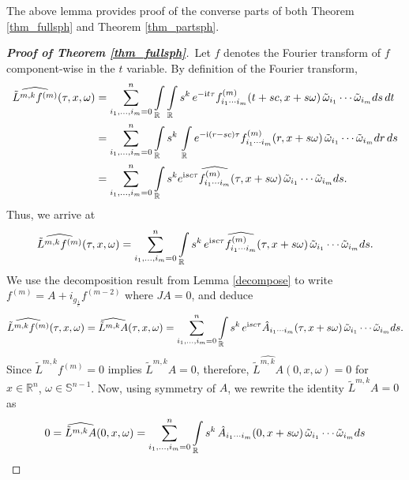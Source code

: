 \documentclass[11pt,a4paper,reqno]{amsart}
\renewcommand{\i}{\mathrm{i}}
\newcommand{\R}{\mathbb{R}}
\renewcommand{\S}{\mathbb{S}}
\begin{document}
	The above lemma provides proof of the converse parts of both Theorem \ref{thm_fullsph} and Theorem \ref{thm_partsph}.
	\begin{proof}[\textbf{Proof of Theorem \ref{thm_fullsph}}]
		\,Let $\widehat{f}$ denotes the Fourier transform of $f$ component-wise in  the $t$ variable.
		By definition of the Fourier transform,
		\begin{align*}
			\widehat{\tilde{L}^{m,k}f^{(m)}}(\tau,x,\omega)
			&= \sum_{i_1,\dots ,i_m=0}^{n}\int\limits_{\mathbb{R}} \int\limits_{\mathbb{R}} s^k\, e^{-\i t \tau} f^{(m)}_{i_1\cdots i_m}(t+sc,x+s\omega) \,\Tilde{\omega}_{i_1}\cdots \Tilde{\omega}_{i_m} ds\,  dt\\
			&=\sum_{i_1,\dots ,i_m=0}^{n} \int\limits_{\mathbb{R}} s^k\,\int\limits_{\mathbb{R}} e^{-\i (r-sc) \tau} f^{(m)}_{i_1\cdots i_m}(r,x+s\omega) \,\Tilde{\omega}_{i_1}\cdots \Tilde{\omega}_{i_m} dr\,  ds\\
			&=\sum_{i_1,\dots ,i_m=0}^{n} \int\limits_{\mathbb{R}} s^k e^{\i sc \tau} \widehat{f^{(m)}_{i_1\cdots i_m}}(\tau,x+s\omega) \,\Tilde{\omega}_{i_1}\cdots \Tilde{\omega}_{i_m}  ds.
		\end{align*}
	Thus, we arrive at
		\begin{equation}\label{main_relation}
			\widehat{\tilde{L}^{m,k}f^{(m)}}(\tau,x,\omega)=\sum_{i_1,\dots ,i_m=0}^{n}\int\limits_{\mathbb{R}} s^k\, e^{\i sc \tau} \widehat{f^{(m)}_{i_1\cdots i_m}}(\tau,x+s\omega)\, \Tilde{\omega}_{i_1}\cdots \Tilde{\omega}_{i_m}  ds.
		\end{equation}
		We use the decomposition result from  Lemma \ref{decompose} to write $f^{(m)} = A+i_{g_{\frac{1}{c}}}f^{(m-2)}$ where $JA=0$, and deduce
		\begin{align}\label{Fourier_tra_l_g}
			\widehat{\tilde{L}^{m,k}f^{(m)}}(\tau,x,\omega)=\widehat{\tilde{L}^{m,k}A}(\tau,x,\omega)=\sum_{i_1,\dots ,i_m=0}^{n}\int\limits_{\mathbb{R}} s^k\, e^{\i sc \tau} \hat{A}_{i_1\cdots i_m}(\tau,x+s\omega) \,\Tilde{\omega}_{i_1}\cdots \Tilde{\omega}_{i_m}  ds .
		\end{align}
		Since $\tilde{L}^{m,k}f^{(m)} =0$ implies $ \tilde{L}^{m,k}A=0$, therefore, $\widehat{\tilde{L}^{m,k}A}(0,x,\omega)=0$ for $x\in \R^{n}$, $\omega \in \S^{n-1}$.
		Now, using symmetry of $A$, we rewrite the identity $\tilde{L}^{m,k}A=0$ as
		\begin{equation}\label{step_1}
			\begin{aligned}
				0= \widehat{\tilde{L}^{m,k}A}(0,x,\omega)
				&=\sum_{i_1,\dots ,i_m=0}^{n}\int\limits_{\mathbb{R}} s^k\, \hat{A}_{i_1\cdots i_m}(0,x+s\omega)\, \Tilde{\omega}_{i_1}\cdots \Tilde{\omega}_{i_m}  ds\\

\end{aligned}
\end{equation}
\end{proof}
\end{document}
